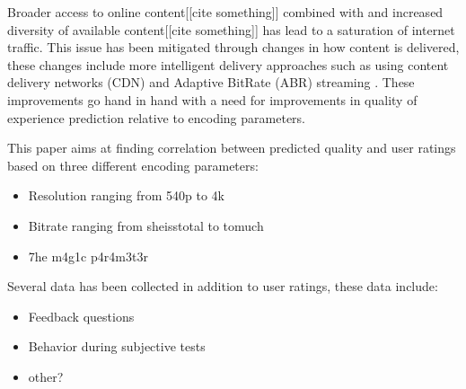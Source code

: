 Broader access to online content[[cite something]] combined with and increased diversity of available content[[cite something]] has lead to a saturation of internet traffic. This issue has been mitigated through changes in how content is delivered, these changes include more intelligent delivery approaches such as using content delivery networks (CDN)\cite{farber2003internet} and Adaptive BitRate (ABR) streaming \cite{brueck2010apparatus}. These improvements go hand in hand with a need for improvements in quality of experience prediction relative to encoding parameters. 

This paper aims at finding correlation between predicted quality and user ratings based on three different encoding parameters:
\begin{itemize}
	\item Resolution ranging from 540p to 4k
	\item Bitrate ranging from sheisstotal to tomuch
	\item 7he m4g1c p4r4m3t3r
\end{itemize}

Several data has been collected in addition to user ratings, these data include:
\begin{itemize}
	\item Feedback questions
	\item Behavior during subjective tests
	\item other?
\end{itemize} 